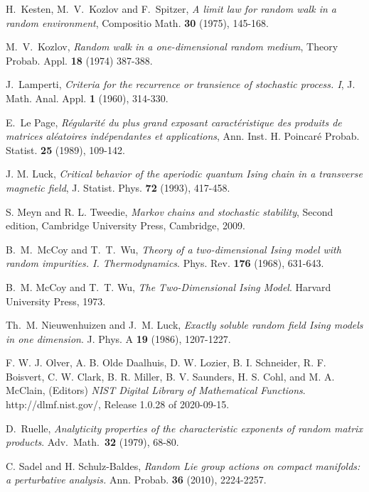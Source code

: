 \documentclass[reqno,11pt]{amsart}
\numberwithin{equation}{section}
\begin{document}
\begin{thebibliography}{99}
H.~Kesten, M.~V.~Kozlov and F.~Spitzer, 
\emph{A limit law for random walk in a random environment},
Compositio Math. {\bf 30} (1975), 145-168. 

M.~V.~Kozlov,  \emph{Random walk in a one-dimensional random medium},   Theory Probab. Appl. {\bf 18} (1974) 387-388.

 J.~Lamperti, \emph{Criteria for the recurrence or transience of stochastic process. I}, J. Math. Anal. Appl. {\bf 1} (1960), 314-330.
 
E.~Le Page, \emph{R\' egularit\'e du plus grand exposant caract\'eristique des produits de matrices al\'eatoires ind\'ependantes et applications},   
Ann. Inst. H. Poincar\'e Probab. Statist. {\bf 25} (1989),  109-142. 

J. M. Luck,    \emph{Critical behavior of the aperiodic quantum Ising chain in a transverse magnetic field}, J. Statist. Phys. {\bf 72} (1993),  417-458.


S. Meyn and R. L.  Tweedie, \emph{Markov chains and stochastic stability},  Second edition,  Cambridge University Press, Cambridge, 2009.

B.~M.~McCoy and T.~T.~Wu, 
\emph {Theory of a two-dimensional Ising model with random impurities.
  {I}. Thermodynamics}.
Phys. Rev. \textbf{176} (1968), 631-643.

B.~M. McCoy and  T.~T. Wu, 
\emph{The Two-Dimensional Ising Model}. Harvard University Press, 1973.


 Th.~M. Nieuwenhuizen and J.~M. Luck,   \emph{Exactly soluble random field Ising models in one dimension}. 
{J. Phys. A} \textbf{19} (1986), 1207-1227.

F. W. J. Olver, A. B. Olde Daalhuis, D. W. Lozier, B. I. Schneider, R. F. Boisvert, C. W. Clark, B. R. Miller, B. V. Saunders, H. S. Cohl, and M. A. McClain, (Editors)
  \emph{NIST Digital Library of Mathematical Functions}.
  http://dlmf.nist.gov/, Release 1.0.28 of 2020-09-15. 

	D.~Ruelle, \emph{Analyticity properties of the characteristic exponents of random matrix products}. Adv.\ Math.\ \textbf{32} (1979), 68-80.

C. Sadel and  H. Schulz-Baldes, \emph{Random Lie group actions on compact manifolds: a perturbative analysis.}
Ann. Probab. {\bf 36} (2010), 2224-2257.


\end{thebibliography}
\end{document}
